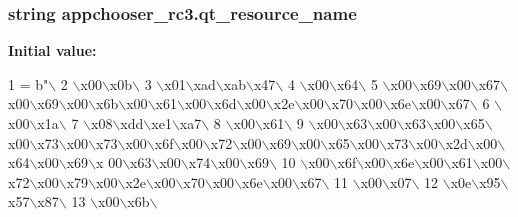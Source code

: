 \subsubsection[{qt\+\_\+resource\+\_\+name}]{\setlength{\rightskip}{0pt plus 5cm}string appchooser\+\_\+rc3.\+qt\+\_\+resource\+\_\+name}\label{namespaceappchooser__rc3_a6c5e8ec139f8d08fbc99a831729744db}
{\bfseries Initial value\+:}
\begin{DoxyCode}
1 = b\textcolor{stringliteral}{"\(\backslash\)}
2 \textcolor{stringliteral}{\(\backslash\)x00\(\backslash\)x0b\(\backslash\)}
3 \textcolor{stringliteral}{\(\backslash\)x01\(\backslash\)xad\(\backslash\)xab\(\backslash\)x47\(\backslash\)}
4 \textcolor{stringliteral}{\(\backslash\)x00\(\backslash\)x64\(\backslash\)}
5 \textcolor{stringliteral}{\(\backslash\)x00\(\backslash\)x69\(\backslash\)x00\(\backslash\)x67\(\backslash\)x00\(\backslash\)x69\(\backslash\)x00\(\backslash\)x6b\(\backslash\)x00\(\backslash\)x61\(\backslash\)x00\(\backslash\)x6d\(\backslash\)x00\(\backslash\)x2e\(\backslash\)x00\(\backslash\)x70\(\backslash\)x00\(\backslash\)x6e\(\backslash\)x00\(\backslash\)x67\(\backslash\)}
6 \textcolor{stringliteral}{\(\backslash\)x00\(\backslash\)x1a\(\backslash\)}
7 \textcolor{stringliteral}{\(\backslash\)x08\(\backslash\)xdd\(\backslash\)xe1\(\backslash\)xa7\(\backslash\)}
8 \textcolor{stringliteral}{\(\backslash\)x00\(\backslash\)x61\(\backslash\)}
9 \textcolor{stringliteral}{\(\backslash\)x00\(\backslash\)x63\(\backslash\)x00\(\backslash\)x63\(\backslash\)x00\(\backslash\)x65\(\backslash\)x00\(\backslash\)x73\(\backslash\)x00\(\backslash\)x73\(\backslash\)x00\(\backslash\)x6f\(\backslash\)x00\(\backslash\)x72\(\backslash\)x00\(\backslash\)x69\(\backslash\)x00\(\backslash\)x65\(\backslash\)x00\(\backslash\)x73\(\backslash\)x00\(\backslash\)x2d\(\backslash\)x00\(\backslash\)x64\(\backslash\)x00\(\backslash\)x69\(\backslash\)x
      00\(\backslash\)x63\(\backslash\)x00\(\backslash\)x74\(\backslash\)x00\(\backslash\)x69\(\backslash\)}
10 \textcolor{stringliteral}{\(\backslash\)x00\(\backslash\)x6f\(\backslash\)x00\(\backslash\)x6e\(\backslash\)x00\(\backslash\)x61\(\backslash\)x00\(\backslash\)x72\(\backslash\)x00\(\backslash\)x79\(\backslash\)x00\(\backslash\)x2e\(\backslash\)x00\(\backslash\)x70\(\backslash\)x00\(\backslash\)x6e\(\backslash\)x00\(\backslash\)x67\(\backslash\)}
11 \textcolor{stringliteral}{\(\backslash\)x00\(\backslash\)x07\(\backslash\)}
12 \textcolor{stringliteral}{\(\backslash\)x0e\(\backslash\)x95\(\backslash\)x57\(\backslash\)x87\(\backslash\)}
13 \textcolor{stringliteral}{\(\backslash\)x00\(\backslash\)x6b\(\backslash\)}

\end{DoxyCode}
